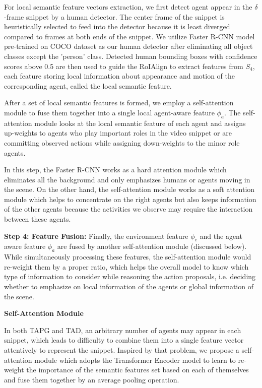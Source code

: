 \documentclass{ieeeaccess}
\begin{document}
For local semantic feature vectors extraction, we first detect agent appear in the $\delta$-frame snippet by a human detector. The center frame of the snippet is heuristically selected to feed into the detector because it is least diverged compared to frames at both ends of the snippet. We utilize Faster R-CNN \cite{FasterRCNN} model pre-trained on COCO dataset \cite{cocodataset} as our human detector after eliminating all object classes except the 'person' class. Detected human bounding boxes with confidence scores above 0.5 are then used to guide the RoIAlign \cite{MaskRCNN_ICCV17} to extract features from $S_4$, each feature storing local information about appearance and motion of the corresponding agent, called the local semantic feature.

After a set of local semantic features is formed, we employ a self-attention module to fuse them together into a single local agent-aware feature $\phi_a$. The self-attention module looks at the local semantic feature of each agent and assigns up-weights to agents who play important roles in the video snippet or are committing observed actions while assigning down-weights to the minor role agents.

In this step, the Faster R-CNN \cite{FasterRCNN} works as a hard attention module which eliminates all the background and only emphasizes humans or agents moving in the scene. On the other hand, the self-attention module works as a soft attention module which helps to concentrate on the right agents but also keeps information of the other agents because the activities we observe may require the interaction between these agents.

\textbf{Step 4: Feature Fusion:}
Finally, the environment feature $\phi_e$ and the agent aware feature $\phi_a$ are fused by another self-attention module (discussed below). While simultaneously processing these features, the self-attention module would re-weight them by a proper ratio, which helps the overall model to know which type of information to consider while reasoning the action proposals, i.e. deciding whether to emphasize on local information of the agents or global information of the scene.

\textbf{Self-Attention Module}
\label{subsec:trans_encoder}

In both TAPG and TAD, an arbitrary number of agents may appear in each snippet, which leads to difficulty to combine them into a single feature vector attentively to represent the snippet. Inspired by that problem, we propose a self-attention module which adopts the Transformer Encoder model \cite{attention_is_all_you_need} to learn to re-weight the importance of the semantic features set based on each of themselves and fuse them together by an average pooling operation.
\end{document}
